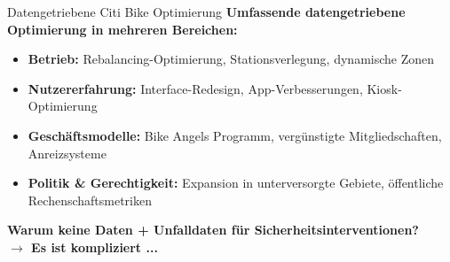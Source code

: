 \documentclass[aspectratio=169,xcolor={usenames,dvipsnames,svgnames,table},10pt,usepdftitle=false,hyperref={bookmarksdepth=3}]{beamer}
\begin{document}

\begin{frame}{Datengetriebene Citi Bike Optimierung}
    \vspace{0.2cm}
    \textbf{Umfassende datengetriebene Optimierung in mehreren Bereichen:}
    \small
    \begin{itemize}
        \item \textbf{Betrieb:} Rebalancing-Optimierung, Stationsverlegung, dynamische Zonen
        \item \textbf{Nutzererfahrung:} Interface-Redesign, App-Verbesserungen, Kiosk-Optimierung
        \item \textbf{Geschäftsmodelle:} Bike Angels Programm, vergünstigte Mitgliedschaften, Anreizsysteme
        \item \textbf{Politik \& Gerechtigkeit:} Expansion in unterversorgte Gebiete, öffentliche Rechenschaftsmetriken
    \end{itemize}
    
    \vspace{0.3cm}
    \normalsize
    \textbf{Warum keine Daten + Unfalldaten für Sicherheitsinterventionen?} \\
    \vspace{0.3cm}
    \textbf{$\rightarrow$ Es ist kompliziert ...}
\end{frame}

\end{document}
